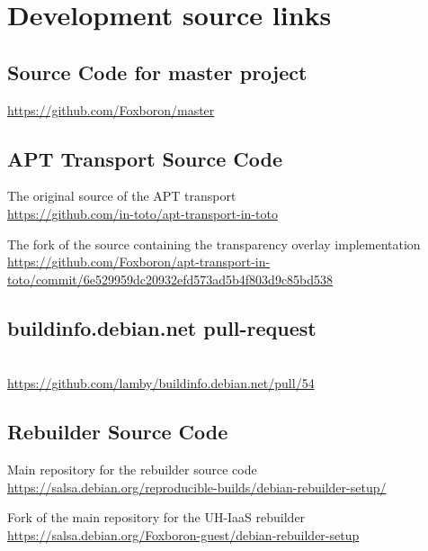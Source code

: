 \documentclass[../Main/thesis.tex]{subfiles}
\begin{document}
\chapter{Development source links}%
\label{appendix:apt-development-source}

\section{Source Code for master project}%
\label{sec:source_code_master}
\url{https://github.com/Foxboron/master}

\section{APT Transport Source Code}%
\label{sec:apt_transport_source_code}
The original source of the APT transport\\
\url{https://github.com/in-toto/apt-transport-in-toto}

The fork of the source containing the transparency overlay implementation\\
\url{https://github.com/Foxboron/apt-transport-in-toto/commit/6e529959dc20932efd573ad5b4f803d9c85bd538}

\section{buildinfo.debian.net pull-request} %
\label{appendix:buildinfo-pull-request}
\\
\url{https://github.com/lamby/buildinfo.debian.net/pull/54}

\section{Rebuilder Source Code}
Main repository for the rebuilder source code\\
\url{https://salsa.debian.org/reproducible-builds/debian-rebuilder-setup/}

Fork of the main repository for the UH-IaaS rebuilder\\
\url{https://salsa.debian.org/Foxboron-guest/debian-rebuilder-setup}
\end{document}
